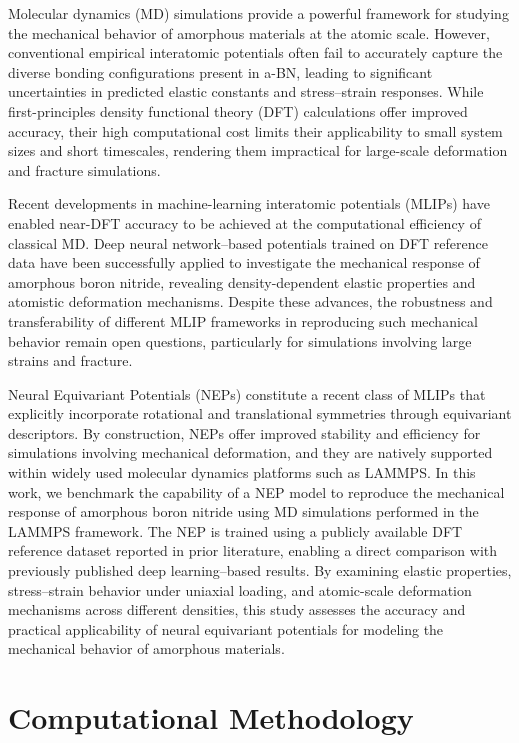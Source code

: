 \documentclass[review, 12pt]{elsarticle}
\numberwithin{equation}{section}
\begin{document}
Molecular dynamics (MD) simulations provide a powerful framework for studying the mechanical behavior of amorphous materials at the atomic scale. However, conventional empirical interatomic potentials often fail to accurately capture the diverse bonding configurations present in a-BN, leading to significant uncertainties in predicted elastic constants and stress--strain responses. While first-principles density functional theory (DFT) calculations offer improved accuracy, their high computational cost limits their applicability to small system sizes and short timescales, rendering them impractical for large-scale deformation and fracture simulations.

Recent developments in machine-learning interatomic potentials (MLIPs) have enabled near-DFT accuracy to be achieved at the computational efficiency of classical MD. Deep neural network--based potentials trained on DFT reference data have been successfully applied to investigate the mechanical response of amorphous boron nitride, revealing density-dependent elastic properties and atomistic deformation mechanisms. Despite these advances, the robustness and transferability of different MLIP frameworks in reproducing such mechanical behavior remain open questions, particularly for simulations involving large strains and fracture.

Neural Equivariant Potentials (NEPs) constitute a recent class of MLIPs that explicitly incorporate rotational and translational symmetries through equivariant descriptors. By construction, NEPs offer improved stability and efficiency for simulations involving mechanical deformation, and they are natively supported within widely used molecular dynamics platforms such as LAMMPS. In this work, we benchmark the capability of a NEP model to reproduce the mechanical response of amorphous boron nitride using MD simulations performed in the LAMMPS framework. The NEP is trained using a publicly available DFT reference dataset reported in prior literature, enabling a direct comparison with previously published deep learning--based results. By examining elastic properties, stress--strain behavior under uniaxial loading, and atomic-scale deformation mechanisms across different densities, this study assesses the accuracy and practical applicability of neural equivariant potentials for modeling the mechanical behavior of amorphous materials.


\section{Computational Methodology}
\end{document}
